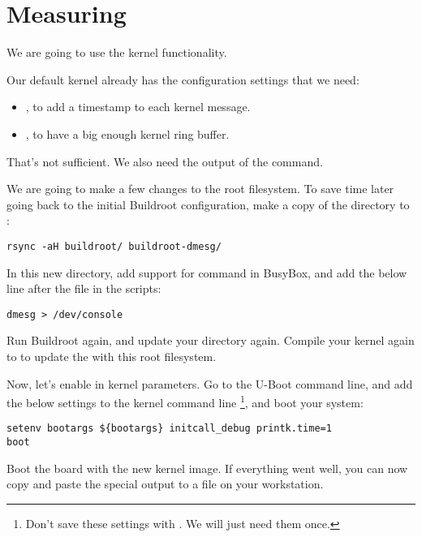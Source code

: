 
\section{Measuring}

We are going to use the kernel  functionality.

Our default kernel already has the configuration settings that we need:
\begin{itemize}
\item {}, to add a timestamp to each kernel
message.
\item {}, to have a big enough kernel ring buffer.
\end{itemize}

That's not sufficient. We also need the output of the 
command.

We are going to make a few changes to the root filesystem. To save time
later going back to the initial Buildroot configuration, make a copy
of the  directory to :

\begin{verbatim}
rsync -aH buildroot/ buildroot-dmesg/
\end{verbatim}

In this new directory, add support for  command in BusyBox,
and add the below line after the  file in the
 scripts:

\begin{verbatim}
dmesg > /dev/console
\end{verbatim}

Run Buildroot again, and update your
 directory again. Compile your
kernel again to to update the  with this root filesystem.

Now, let's enable  in kernel parameters. Go to
the U-Boot command line, and add the below settings to the kernel command line
\footnote{Don't save these settings with . We
will just need them once.}, and boot your system:
\begin{verbatim}
setenv bootargs ${bootargs} initcall_debug printk.time=1
boot
\end{verbatim}

Boot the board with the new kernel image. If everything went well,
you can now copy and paste the special  output to
a  file on your workstation.

